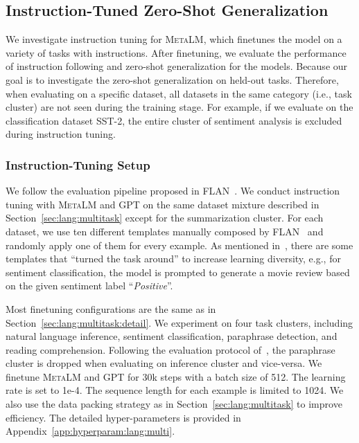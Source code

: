 \documentclass{article}
\theoremstyle{plain}
\theoremstyle{definition}
\theoremstyle{remark}
\newcommand\ours{\textsc{MetaLM}}
\begin{document}
\subsection{Instruction-Tuned Zero-Shot Generalization}
\label{sec:lang:instruct}

We investigate instruction tuning for \ours{}, which finetunes the model on a variety of tasks with instructions.
After finetuning, we evaluate the performance of instruction following and zero-shot generalization for the models.
Because our goal is to investigate the zero-shot generalization on held-out tasks.
Therefore, when evaluating on a specific dataset, all datasets in the same category (i.e., task cluster) are not seen during the training stage.
For example, if we evaluate on the classification dataset SST-2, the entire cluster of sentiment analysis is excluded during instruction tuning.


\subsubsection{Instruction-Tuning Setup}

We follow the evaluation pipeline proposed in FLAN~\citep{flan}.
We conduct instruction tuning with \ours{} and GPT on the same dataset mixture described in Section~\ref{sec:lang:multitask} except for the summarization cluster.
For each dataset, we use ten different templates manually composed by FLAN~\citep{flan} and randomly apply one of them for every example.
As mentioned in~\citep{flan}, there are some templates that ``turned the task around'' to increase learning diversity, e.g., for sentiment classification, the model is prompted to generate a movie review based on the given sentiment label ``\textit{Positive}''.


Most finetuning configurations are the same as in Section~\ref{sec:lang:multitask:detail}.
We experiment on four task clusters, including natural language inference, sentiment classification, paraphrase detection, and reading comprehension.
Following the evaluation protocol of~\citep{flan}, the paraphrase cluster is dropped when evaluating on inference cluster and vice-versa.
We finetune \ours{} and GPT for 30k steps with a batch size of 512.
The learning rate is set to 1e-4.
The sequence length for each example is limited to 1024.
We also use the data packing strategy as in Section~\ref{sec:lang:multitask} to improve efficiency.
The detailed hyper-parameters is provided in  Appendix~\ref{app:hyperparam:lang:multi}.
\end{document}
